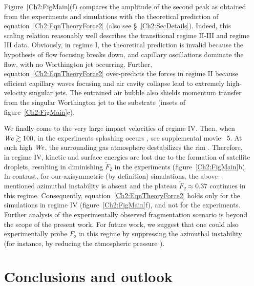 Figure~\ref{Ch2:FigMain}(f) compares the amplitude of the second peak as obtained from the experiments and simulations with the theoretical prediction of equation~\eqref{Ch2:EqnTheoryForce2} (also see \S~\ref{Ch2:SecDetails}). Indeed, this scaling relation reasonably well describes the transitional regime II-III and regime III data. Obviously, in regime I, the theoretical prediction is invalid because the hypothesis of flow focusing breaks down, and capillary oscillations dominate the flow, with no Worthington jet occurring. Further, equation~\eqref{Ch2:EqnTheoryForce2} over-predicts the forces in regime II because efficient capillary waves focusing and air cavity collapse lead to extremely high-velocity singular jets. The entrained air bubble also shields momentum transfer from the singular Worthington jet to the substrate (insets of figure~\ref{Ch2:FigMain}c). 

We finally come to the very large impact velocities of regime IV. Then, when $\mathit{We} \gtrsim 100$, in the experiments splashing occurs \cite{josserand2016drop}, see supplemental movie~{\color{Myfig} 5}. At such high $\mathit{We}$, the surrounding gas atmosphere destabilizes the rim \cite{eggers2010drop, riboux2014experiments}. Therefore, in regime IV, kinetic and surface energies are lost due to the formation of satellite droplets, resulting in diminishing $\tilde{F}_2$ in the experiments (figure~\ref{Ch2:FigMain}b). In contrast, for our axisymmetric (by definition) simulations, the above-mentioned azimuthal instability is absent \cite{eggers2010drop} and the plateau $\tilde{F}_2 \approx 0.37$ continues in this regime. Consequently, equation~\eqref{Ch2:EqnTheoryForce2} holds only for the simulations in regime IV (figure~\ref{Ch2:FigMain}f), and not for the experiments. Further analysis of the experimentally observed fragmentation scenario is beyond the scope of the present work. For future work, we suggest that one could also experimentally probe $F_2$ in this regime by suppressing the azimuthal instability (for instance, by reducing the atmospheric pressure \cite{xu2005drop}). 

\section{Conclusions and outlook}\label{Ch2:SecConclusion}

